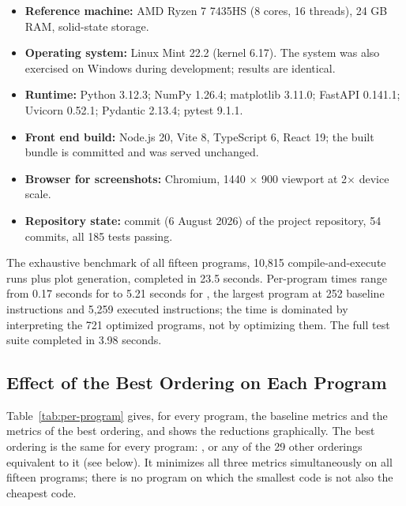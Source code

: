 \begin{itemize}
  \item \textbf{Reference machine:} AMD Ryzen 7 7435HS (8 cores, 16 threads), 24 GB RAM, solid-state storage.
  \item \textbf{Operating system:} Linux Mint 22.2 (kernel 6.17). The system was also exercised on Windows during development; results are identical.
  \item \textbf{Runtime:} Python 3.12.3; NumPy 1.26.4; matplotlib 3.11.0; FastAPI 0.141.1; Uvicorn 0.52.1; Pydantic 2.13.4; pytest 9.1.1.
  \item \textbf{Front end build:} Node.js 20, Vite 8, TypeScript 6, React 19; the built bundle is committed and was served unchanged.
  \item \textbf{Browser for screenshots:} Chromium, 1440 $\times$ 900 viewport at 2$\times$ device scale.
  \item \textbf{Repository state:} commit  (6 August 2026) of the project repository, 54 commits, all 185 tests passing.
\end{itemize}

The exhaustive benchmark of all fifteen programs, 10{,}815 compile-and-execute runs plus plot generation, completed in 23.5 seconds. Per-program times range from 0.17 seconds for  to 5.21 seconds for \code{2mm}, the largest program at 252 baseline instructions and 5{,}259 executed instructions; the time is dominated by interpreting the 721 optimized programs, not by optimizing them. The full test suite completed in 3.98 seconds.

\subsection{Effect of the Best Ordering on Each Program}

Table~\ref{tab:per-program} gives, for every program, the baseline metrics and the metrics of the best ordering, and  shows the reductions graphically. The best ordering is the same for every program: , or any of the 29 other orderings equivalent to it (see below). It minimizes all three metrics simultaneously on all fifteen programs; there is no program on which the smallest code is not also the cheapest code.

